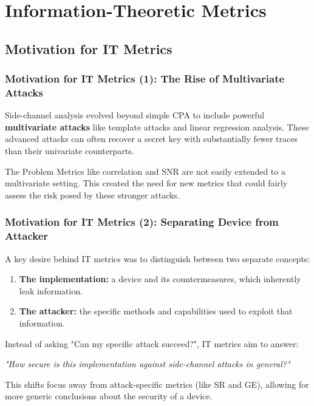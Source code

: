 \section{Information-Theoretic Metrics}

\subsection{Motivation for IT Metrics}

\begin{frame}
    \frametitle{Motivation for IT Metrics (1): The Rise of Multivariate Attacks}
    
     Side-channel analysis evolved beyond simple CPA to include powerful \textbf{multivariate attacks} like template attacks and linear regression analysis.
     \newline These advanced attacks can often recover a secret key with substantially fewer traces than their univariate counterparts.
   
    
    \begin{alertblock}{The Problem}
        Metrics like correlation and SNR are not easily extended to a multivariate setting. This created the need for new metrics that could fairly assess the risk posed by these stronger attacks.
    \end{alertblock}
\end{frame}

\begin{frame}
    \frametitle{Motivation for IT Metrics (2): Separating Device from Attacker}
    
  
    A key desire behind IT metrics was to distinguish between two separate concepts:
    \begin{enumerate}
        \item \textbf{The implementation:} a device and its countermeasures, which inherently leak information.
        \item \textbf{The attacker:} the specific methods and capabilities used to exploit that information.
    \end{enumerate}
  
    
        Instead of asking "Can my specific attack succeed?", IT metrics aim to answer:
        \vspace{0.3cm}
        
        \centering
        \textit{"How secure is this implementation against side-channel attacks in general?"}
        \vspace{0.3cm}
        
        This shifts focus away from attack-specific metrics (like SR and GE), allowing for more generic conclusions about the security of a device.
    
\end{frame}

